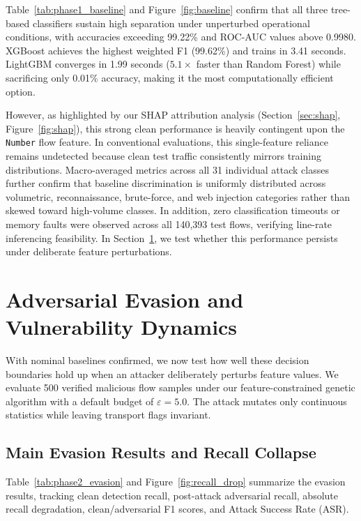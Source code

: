 \documentclass[iicol,pdflatex,sn-mathphys-num]{sn-jnl}
\begin{document}
Table~\ref{tab:phase1_baseline} and Figure~\ref{fig:baseline} confirm that all three tree-based classifiers sustain high separation under unperturbed operational conditions, with accuracies exceeding 99.22\% and ROC-AUC values above 0.9980. XGBoost achieves the highest weighted F1 (99.62\%) and trains in 3.41 seconds. LightGBM converges in 1.99 seconds ($5.1\times$ faster than Random Forest) while sacrificing only 0.01\% accuracy, making it the most computationally efficient option. 

However, as highlighted by our SHAP attribution analysis (Section~\ref{sec:shap}, Figure~\ref{fig:shap}), this strong clean performance is heavily contingent upon the \texttt{Number} flow feature. In conventional evaluations, this single-feature reliance remains undetected because clean test traffic consistently mirrors training distributions. Macro-averaged metrics across all 31 individual attack classes further confirm that baseline discrimination is uniformly distributed across volumetric, reconnaissance, brute-force, and web injection categories rather than skewed toward high-volume classes. In addition, zero classification timeouts or memory faults were observed across all 140,393 test flows, verifying line-rate inferencing feasibility. In Section~\ref{sec:phase2}, we test whether this performance persists under deliberate feature perturbations.

\section{Adversarial Evasion and Vulnerability Dynamics}
\label{sec:phase2}

With nominal baselines confirmed, we now test how well these decision boundaries hold up when an attacker deliberately perturbs feature values. We evaluate 500 verified malicious flow samples under our feature-constrained genetic algorithm with a default budget of $\varepsilon = 5.0$. The attack mutates only continuous statistics while leaving transport flags invariant.

\subsection{Main Evasion Results and Recall Collapse}
Table~\ref{tab:phase2_evasion} and Figure~\ref{fig:recall_drop} summarize the evasion results, tracking clean detection recall, post-attack adversarial recall, absolute recall degradation, clean/adversarial F1 scores, and Attack Success Rate (ASR).
\end{document}
